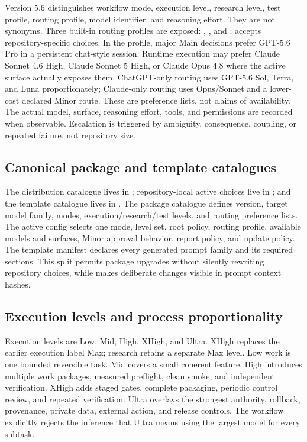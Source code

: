 \documentclass[11pt,a4paper]{article}
\newcommand{\code}[1]{\texttt{\detokenize{#1}}}
\begin{document}
Version 5.6 distinguishes workflow mode, execution level, research level, test profile, routing
profile, model identifier, and reasoning effort. They are not synonyms. Three built-in routing
profiles are exposed: \code{all}, \code{chatgpt_only}, and \code{claude_only}; \code{custom}
accepts repository-specific choices. In the \code{all} profile, major Main decisions prefer
GPT-5.6 Pro in a persistent chat-style session. Runtime execution may prefer Claude Sonnet 4.6
High, Claude Sonnet 5 High, or Claude Opus 4.8 where the active surface actually exposes them.
ChatGPT-only routing uses GPT-5.6 Sol, Terra, and Luna proportionately; Claude-only routing uses
Opus/Sonnet and a lower-cost declared Minor route. These are preference lists, not claims of
availability. The actual model, surface, reasoning effort, tools, and permissions are recorded when
observable. Escalation is triggered by ambiguity, consequence, coupling, or repeated failure, not
repository size.


\subsection{Canonical package and template catalogues}

The distribution catalogue lives in ; repository-local active
choices live in ; and the template catalogue lives in
. The package catalogue defines version, target
model family, modes, execution/research/test levels, and routing preference lists. The active config
selects one mode, level set, root policy, routing profile, available models and surfaces, Minor
approval behavior, report policy, and update policy. The template manifest declares every generated
prompt family and its required sections. This split permits package upgrades without silently
rewriting repository choices, while \code{aw update} makes deliberate changes visible in prompt
context hashes.

\subsection{Execution levels and process proportionality}

Execution levels are Low, Mid, High, XHigh, and Ultra. XHigh replaces the earlier execution label
Max; research retains a separate Max level. Low work is one bounded reversible task. Mid covers a
small coherent feature. High introduces multiple work packages, measured preflight, clean smoke,
and independent verification. XHigh adds staged gates, complete packaging, periodic control review,
and repeated verification. Ultra overlays the strongest authority, rollback, provenance, private
data, external action, and release controls. The workflow explicitly rejects the inference that
Ultra means using the largest model for every subtask.
\end{document}
